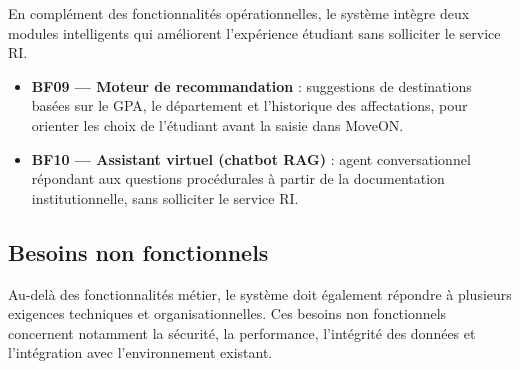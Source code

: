 En complément des fonctionnalités opérationnelles, le système intègre deux modules intelligents qui améliorent l'expérience étudiant sans solliciter le service RI.

\begin{itemize}
    \item \textbf{BF09 --- Moteur de recommandation} : suggestions de destinations basées sur le GPA, le département et l'historique des affectations, pour orienter les choix de l'étudiant avant la saisie dans MoveON.
    \item \textbf{BF10 --- Assistant virtuel (chatbot RAG)} : agent conversationnel répondant aux questions procédurales à partir de la documentation institutionnelle, sans solliciter le service RI.
\end{itemize}

\subsection{Besoins non fonctionnels}

Au-delà des fonctionnalités métier, le système doit également répondre à plusieurs exigences techniques et organisationnelles. Ces besoins non fonctionnels concernent notamment la sécurité, la performance, l'intégrité des données et l'intégration avec l'environnement existant.

